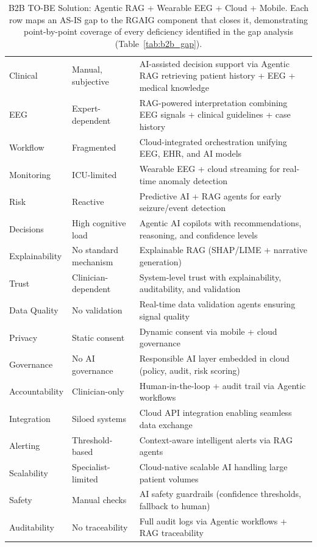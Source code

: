{\tablestripes\tablefontsize
{}
\begin{xltabular}{\textwidth}{@{} >{\raggedright\arraybackslash}p{3.0cm} >{\raggedright\arraybackslash}p{3.2cm} L @{}}
\caption[B2B TO-BE Solution: Agentic RAG + Wearable EEG + Cloud +]{B2B TO-BE Solution: Agentic RAG + Wearable EEG + Cloud + Mobile. Each row maps an AS-IS gap to the RGAIG component that closes it, demonstrating point-by-point coverage of every deficiency identified in the gap analysis (Table~\ref{tab:b2b_gap}).}\label{tab:b2b_tobe} \\
\toprule
{} &  &  \\
\midrule
\endfirsthead
\endhead
\bottomrule
\endlastfoot
Clinical & Manual, subjective & AI-assisted decision support via Agentic RAG retrieving patient history + EEG + medical knowledge \\
\addlinespace
EEG & Expert-dependent & RAG-powered interpretation combining EEG signals + clinical guidelines + case history \\
\addlinespace
Workflow & Fragmented & Cloud-integrated orchestration unifying EEG, EHR, and AI models \\
\addlinespace
Monitoring & ICU-limited & Wearable EEG + cloud streaming for real-time anomaly detection \\
\addlinespace
Risk & Reactive & Predictive AI + RAG agents for early seizure/event detection \\
\addlinespace
Decisions & High cognitive load & Agentic AI copilots with recommendations, reasoning, and confidence levels \\
\addlinespace
Explainability & No standard mechanism & Explainable RAG (SHAP/LIME + narrative generation) \\
\addlinespace
Trust & Clinician-dependent & System-level trust with explainability, auditability, and validation \\
\addlinespace
Data Quality & No validation & Real-time data validation agents ensuring signal quality \\
\addlinespace
Privacy & Static consent & Dynamic consent via mobile + cloud governance \\
\addlinespace
Governance & No AI governance & Responsible AI layer embedded in cloud (policy, audit, risk scoring) \\
\addlinespace
Accountability & Clinician-only & Human-in-the-loop + audit trail via Agentic workflows \\
\addlinespace
Integration & Siloed systems & Cloud API integration enabling seamless data exchange \\
\addlinespace
Alerting & Threshold-based & Context-aware intelligent alerts via RAG agents \\
\addlinespace
Scalability & Specialist-limited & Cloud-native scalable AI handling large patient volumes \\
\addlinespace
Safety & Manual checks & AI safety guardrails (confidence thresholds, fallback to human) \\
\addlinespace
Auditability & No traceability & Full audit logs via Agentic workflows + RAG traceability \\
\end{xltabular}}
